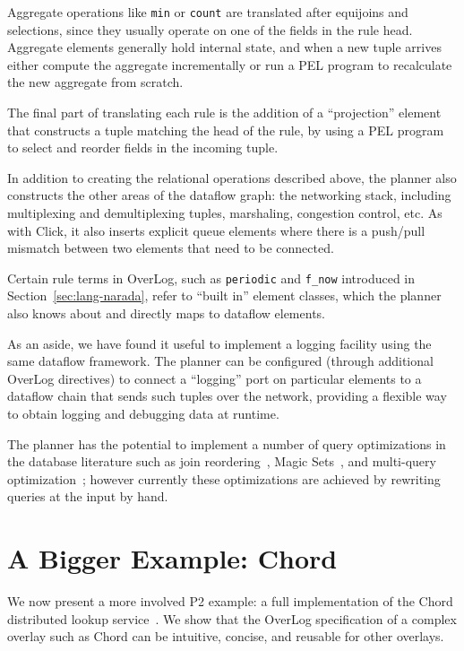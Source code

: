 \documentclass{sig-alt-full}
\def\Sys{P2\xspace}
\def\Lang{OverLog\xspace}
\def\ELang{PEL\xspace}
\newcommand{\ol}[1]{{\tt\footnotesize#1}}
\begin{document}
Aggregate operations like \ol{min} or \ol{count} are
translated after equijoins and selections, since they 
usually operate on one of the fields in the rule head.  Aggregate
elements generally hold  internal state, and when a new tuple
arrives either compute the aggregate incrementally or run a \ELang
program to recalculate the new aggregate from scratch.

The final part of translating each rule is the addition of a
``projection'' element that constructs a tuple matching the head of
the rule, by using a \ELang program to select and
reorder fields in the incoming tuple. 

In addition to creating the relational operations described above, the
planner also constructs the other areas of the dataflow graph: the
networking stack, including multiplexing and demultiplexing tuples,
marshaling, congestion control, etc.  As with Click, it also inserts
explicit queue elements where there is a push/pull mismatch between
two elements that need to be connected.

Certain rule terms in \Lang, such as \ol{periodic} and
\ol{f\_now} introduced in Section~\ref{sec:lang-narada},  refer to
``built in'' element classes, which the planner also knows about and
directly maps to dataflow elements.

As an aside, we have found it useful to implement a logging facility
using the same dataflow framework.  The planner can be configured
(through additional \Lang directives) to connect a ``logging'' port on
particular elements to a dataflow chain that sends such tuples over the
network, providing a flexible way to obtain logging  and debugging
data at runtime. 
 
The planner has the potential to implement a number of 
query optimizations in the database literature such as join 
reordering~\cite{selinger79},  Magic
Sets~\cite{alicebook,loo-hotnets04}, and
multi-query optimization~\cite{sellis-mqo};
 however currently
these optimizations are achieved by rewriting queries at the input by
hand.


\section{A Bigger Example: Chord}
\label{sec:chord}
We now present a more involved \Sys example: a full implementation of the
Chord distributed lookup service~\cite{chord}.  We show
that the \Lang specification of a complex overlay such as Chord can be
intuitive, concise, and reusable for other overlays.
\end{document}
